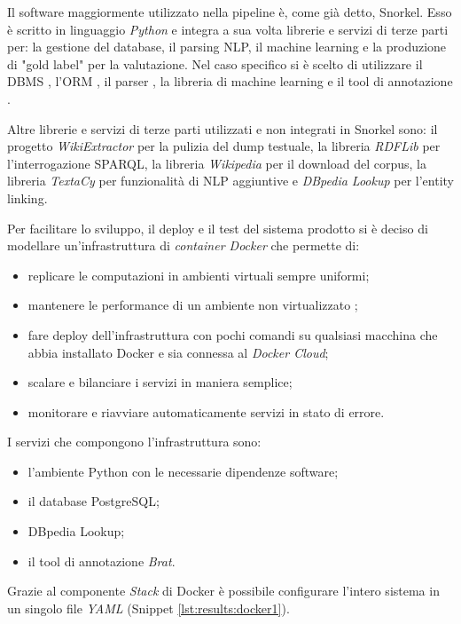 Il software maggiormente utilizzato nella pipeline è, come già detto, Snorkel. Esso è scritto in linguaggio \textit{Python} e integra a sua volta librerie e servizi di terze parti per: la gestione del database, il parsing NLP, il machine learning e la produzione di "gold label" per la valutazione.
Nel caso specifico si è scelto di utilizzare il DBMS  \cite{postgresql}, l'ORM  \cite{sql_alchemy}, il parser  \cite{spacy}, la libreria di machine learning  \cite{tensorflow} e il tool di annotazione  \cite{brat}.

Altre librerie e servizi di terze parti utilizzati e non integrati in Snorkel sono: il progetto \textit{WikiExtractor} \cite{WikiExtractor} per la pulizia del dump testuale, la libreria \textit{RDFLib} \cite{RDFLib} per l'interrogazione SPARQL, la libreria \textit{Wikipedia} \cite{wikipedia_API} per il download del corpus, la libreria \textit{TextaCy} \cite{textacy} per funzionalità di NLP aggiuntive e \textit{DBpedia Lookup} \cite{dbpedia_lookup} per l'entity linking.


Per facilitare lo sviluppo, il deploy e il test del sistema prodotto si è deciso di modellare un'infrastruttura di \textit{container Docker} \cite{docker} che permette di:
\begin{itemize}
\item replicare le computazioni in ambienti virtuali sempre uniformi;
\item mantenere le performance di un ambiente non virtualizzato \cite{Felter2015AnUP};
\item fare deploy dell'infrastruttura con pochi comandi su qualsiasi macchina che abbia installato Docker e sia connessa al \textit{Docker Cloud};
\item scalare e bilanciare i servizi in maniera semplice;
\item monitorare e riavviare automaticamente servizi in stato di errore.
\end{itemize}

I servizi che compongono l'infrastruttura sono: 
\begin{itemize}
\item l'ambiente Python con le necessarie dipendenze software;
\item il database PostgreSQL;
\item DBpedia Lookup;
\item il tool di annotazione \textit{Brat}.
\end{itemize}
Grazie al componente \textit{Stack} di Docker è possibile configurare l'intero sistema in un singolo file \textit{YAML} (Snippet \ref{lst:results:docker1}).

